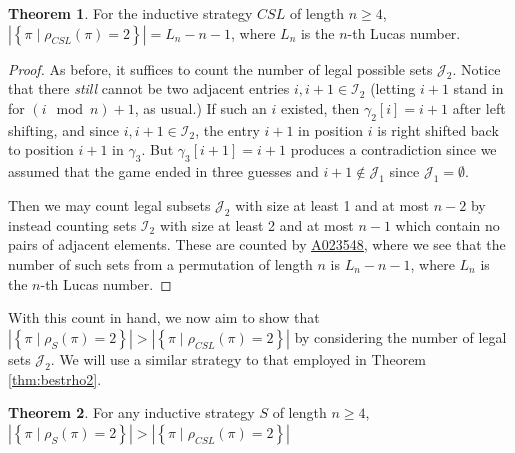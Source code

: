 \documentclass[article]{amsart}
\theoremstyle{definition}
\newtheorem{theorem}{Theorem}[section]
\theoremstyle{definition}
\theoremstyle{remark}
\newcommand{\oeis}[1]{\href{https://oeis.org/#1}{\rm  \underline{#1}}}
\begin{document}
\begin{theorem} \label{thm:csl_rho2}
    For the inductive strategy $CSL$ of length $n \geq 4$, $\left| \left\{ \pi \mid \rho_{CSL}(\pi) = 2 \right\} \right| = L_n - n - 1$, where $L_n$ is the $n$-th Lucas number.
\end{theorem}

\begin{proof}
As before, it suffices to count the number of legal possible sets $\mathcal{J}_2$. Notice that there \textit{still} cannot be two adjacent entries $i,i+1 \in \mathcal{I}_2$ (letting $i+1$ stand in for $(i \mod n) + 1$, as usual.) If such an $i$ existed, then $\gamma_2[i] = i+1$ after left shifting, and since $i,i+1 \in \mathcal{I}_2$, the entry $i+1$ in position $i$ is right shifted back to position $i+1$ in $\gamma_3$. But $\gamma_3[i+1] = i+1$ produces a contradiction since we assumed that the game ended in three guesses and $i+1 \notin \mathcal{J}_1$ since $\mathcal{J}_1 = \emptyset$. 

Then we may count legal subsets $\mathcal{J}_2$ with size at least 1 and at most $n-2$ by instead counting sets $\mathcal{I}_2$ with size at least 2 and at most $n-1$ which contain no pairs of adjacent elements. These are counted by \oeis{A023548}, where we see that the number of such sets from a permutation of length $n$ is $L_n - n - 1$, where $L_n$ is the $n$-th Lucas number.

\end{proof}

With this count in hand, we now aim to show that $\left| \left\{ \pi \mid \rho_{S}(\pi) = 2 \right\} \right| > \left| \left\{ \pi \mid \rho_{CSL}(\pi) = 2 \right\} \right|$ by considering the number of legal sets $\mathcal{J}_2$. We will use a similar strategy to that employed in Theorem \ref{thm:bestrho2}.

\begin{theorem} \label{thm:worstrho2}
    For any inductive strategy $S$ of length $n \geq 4$, $\left| \left\{ \pi \mid \rho_{S}(\pi) = 2 \right\} \right| > \left| \left\{ \pi \mid \rho_{CSL}(\pi) = 2 \right\} \right|$
\end{theorem}
\end{document}
